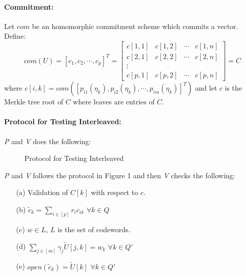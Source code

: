 \documentclass[runningheads]{llncs}
\begin{document}
\paragraph{Commitment:} Let $com$ be an homomorphic commitment scheme which commits a vector. Define:
$$com(U)= [c_1,c_2,\cdots , c_p]^T=
 \begin{bmatrix} 
c[1,1] & c[1,2] & \cdots & c[1,n] \\
c[2,1] & c[2,2] & \cdots & c[2,n] \\
\vdots\\
c[p,1] & c[p,2] & \cdots & c[p,n]
\end{bmatrix}
=C$$
where $c[i,k]=com([p_{i1}(\eta_k),p_{i2}(\eta_k),\cdots , p_{im}(\eta_k)]^T)$ and let $c$ is the Merkle tree root of $C$ where leaves are entries of $C$.

\paragraph{Protocol for Testing Interleaved:}
\textit{P} and \textit{V} does the following:

\begin{figure}[htb!]
	\centering
	\caption{Protocol for Testing Interleaved}
\end{figure}

\textit{P} and \textit{V} follows the protocol in Figure 1 and then
\textit{V} checks the following:
\begin{itemize}
	\item[(a)] Validation of $C[k]$ with respect to $c$.
	\item[(b)] $\tilde{c}_k = \sum\limits_{i\in[p]} r_ic_{ik}$ $\forall k\in Q$
	\item[(c)] $w\in L$, $L$ is the set of codewords.
	\item[(d)] $\sum\limits_{j\in [m]} \gamma_j \widetilde{U}[j,k] = w_k$ $\forall k\in Q'$
	\item[(e)] $open(\tilde{c}_k) = \widetilde{U}[k]$ $\forall k\in Q'$
\end{itemize}
\end{document}
